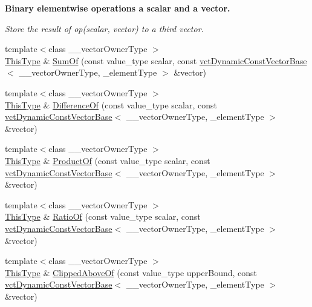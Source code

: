 \begin{Indent}{\bf Binary elementwise operations a scalar and a vector.}\par
{\em Store the result of op(scalar, vector) to a third vector. }\begin{DoxyCompactItemize}
\item 
{\footnotesize template$<$class \-\_\-\-\_\-vector\-Owner\-Type $>$ }\\\hyperlink{classvct_dynamic_const_vector_base_a39da273523717f678f54d3321ebca3dd}{This\-Type} \& \hyperlink{classvct_dynamic_vector_base_af487dcdd740d3ed4b207d326e5fd6f12}{Sum\-Of} (const value\-\_\-type scalar, const \hyperlink{classvct_dynamic_const_vector_base}{vct\-Dynamic\-Const\-Vector\-Base}$<$ \-\_\-\-\_\-vector\-Owner\-Type, \-\_\-element\-Type $>$ \&vector)
\item 
{\footnotesize template$<$class \-\_\-\-\_\-vector\-Owner\-Type $>$ }\\\hyperlink{classvct_dynamic_const_vector_base_a39da273523717f678f54d3321ebca3dd}{This\-Type} \& \hyperlink{classvct_dynamic_vector_base_afb5e23e0a2b99a13b467d748e9cabb1f}{Difference\-Of} (const value\-\_\-type scalar, const \hyperlink{classvct_dynamic_const_vector_base}{vct\-Dynamic\-Const\-Vector\-Base}$<$ \-\_\-\-\_\-vector\-Owner\-Type, \-\_\-element\-Type $>$ \&vector)
\item 
{\footnotesize template$<$class \-\_\-\-\_\-vector\-Owner\-Type $>$ }\\\hyperlink{classvct_dynamic_const_vector_base_a39da273523717f678f54d3321ebca3dd}{This\-Type} \& \hyperlink{classvct_dynamic_vector_base_a2f7c76bbe958efd932aa4bc0dcce4108}{Product\-Of} (const value\-\_\-type scalar, const \hyperlink{classvct_dynamic_const_vector_base}{vct\-Dynamic\-Const\-Vector\-Base}$<$ \-\_\-\-\_\-vector\-Owner\-Type, \-\_\-element\-Type $>$ \&vector)
\item 
{\footnotesize template$<$class \-\_\-\-\_\-vector\-Owner\-Type $>$ }\\\hyperlink{classvct_dynamic_const_vector_base_a39da273523717f678f54d3321ebca3dd}{This\-Type} \& \hyperlink{classvct_dynamic_vector_base_a7051973a756f647f4b846406f2e91ede}{Ratio\-Of} (const value\-\_\-type scalar, const \hyperlink{classvct_dynamic_const_vector_base}{vct\-Dynamic\-Const\-Vector\-Base}$<$ \-\_\-\-\_\-vector\-Owner\-Type, \-\_\-element\-Type $>$ \&vector)
\item 
{\footnotesize template$<$class \-\_\-\-\_\-vector\-Owner\-Type $>$ }\\\hyperlink{classvct_dynamic_const_vector_base_a39da273523717f678f54d3321ebca3dd}{This\-Type} \& \hyperlink{classvct_dynamic_vector_base_a4915805fdc719f586d0543e37c253b76}{Clipped\-Above\-Of} (const value\-\_\-type upper\-Bound, const \hyperlink{classvct_dynamic_const_vector_base}{vct\-Dynamic\-Const\-Vector\-Base}$<$ \-\_\-\-\_\-vector\-Owner\-Type, \-\_\-element\-Type $>$ \&vector)

\end{DoxyCompactItemize}
\end{Indent}
